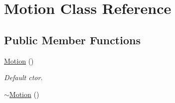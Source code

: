 \hypertarget{class_motion}{}\section{Motion Class Reference}
\label{class_motion}
\subsection*{Public Member Functions}
\begin{DoxyCompactItemize}
\item 
\hyperlink{class_motion_a444a2569aaadd10d76b4e6e6bfb3df0c}{Motion} ()\hypertarget{class_motion_a444a2569aaadd10d76b4e6e6bfb3df0c}{}\label{class_motion_a444a2569aaadd10d76b4e6e6bfb3df0c}

\begin{DoxyCompactList}\small\item\em Default ctor. \end{DoxyCompactList}\item 
\hyperlink{class_motion_a3989871f9b2b9b69c88b5437b40a72c6}{$\sim$\+Motion} ()\hypertarget{class_motion_a3989871f9b2b9b69c88b5437b40a72c6}{}\label{class_motion_a3989871f9b2b9b69c88b5437b40a72c6}


\end{DoxyCompactItemize}
